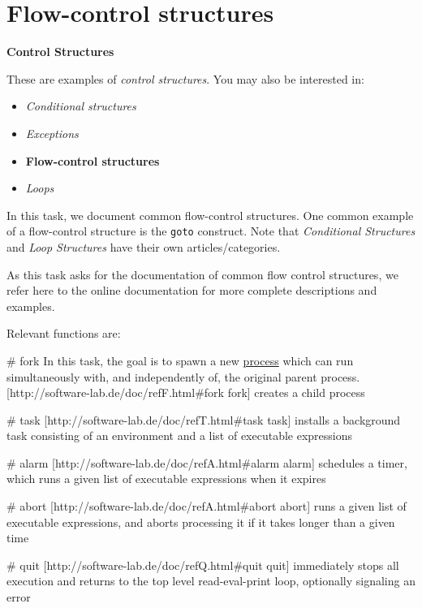 \pagebreak{}
\section*{Flow-control structures}

\textbf{Control Structures}

These are examples of \emph{control structures}. You may also be
interested in:

\begin{itemize}
\item
  \emph{Conditional structures}
\item
  \emph{Exceptions}
\item
  \textbf{Flow-control structures}
\item
  \emph{Loops}
\end{itemize}

In this task, we document common flow-control structures. One common
example of a flow-control structure is the \texttt{goto} construct.
Note that \emph{Conditional Structures} and \emph{Loop Structures}
have their own articles/categories.

\begin{wideverbatim}

As this task asks for the documentation of common flow control structures, we
refer here to the online documentation for more complete descriptions and
examples.

Relevant functions are:

# fork
In this task, the goal is to spawn a new \href{/wiki/Process}{process}
which can run simultaneously with, and independently of, the original
parent process.
[http://software-lab.de/doc/refF.html#fork fork] creates a child process

# task
[http://software-lab.de/doc/refT.html#task task] installs a background task
consisting of an environment and a list of executable expressions

# alarm
[http://software-lab.de/doc/refA.html#alarm alarm] schedules a timer, which
runs a given list of executable expressions when it expires

# abort
[http://software-lab.de/doc/refA.html#abort abort] runs a given list of
executable expressions, and aborts processing it if it takes longer than
a given time

# quit
[http://software-lab.de/doc/refQ.html#quit quit] immediately stops all
execution and returns to the top level read-eval-print loop, optionally
signaling an error

\end{wideverbatim}

